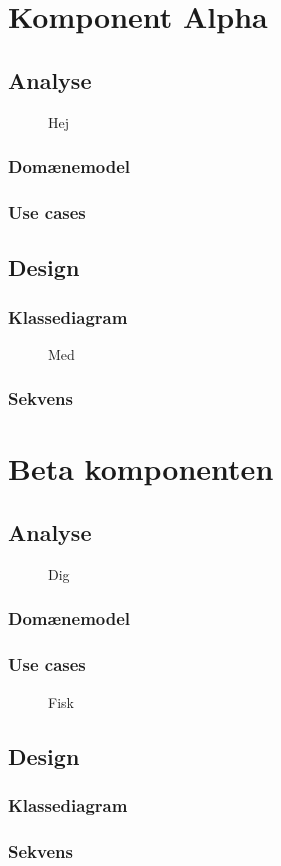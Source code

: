 %
%
\chapter{Komponent Alpha}
\lipsum[1]
\section{Analyse}
\begin{figure}
\caption{Hej}
\end{figure}
\lipsum[2]
\subsection{Domænemodel}
\lipsum[3-5]
\subsection{Use cases}
\lipsum[6-7]
\section{Design}
\lipsum[8]
\subsection{Klassediagram}
\begin{figure}
\caption{Med}
\end{figure}
\lipsum[9-11]
\subsection{Sekvens}
\lipsum[12-13]
%
\chapter{Beta komponenten}
\lipsum[1]
\section{Analyse}
\begin{figure}
\caption{Dig}
\end{figure}
\lipsum[2]
\subsection{Domænemodel}
\lipsum[3-5]
\subsection{Use cases}
\begin{figure}
\caption{Fisk}
\end{figure}
\lipsum[6-7]
\section{Design}
\lipsum[8]
\subsection{Klassediagram}
\lipsum[9-11]
\subsection{Sekvens}
\lipsum[12-17]
%
%
%
